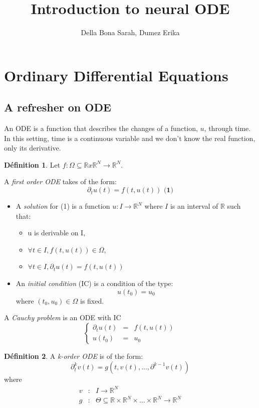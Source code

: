 \documentclass[10pt,a4paper]{article}
\author{Della Bona Sarah, Dumez Erika}
\title{Introduction to neural ODE}
\theoremstyle{definition}
\newtheorem{definition}{Définition}
\theoremstyle{theorem}
\begin{document}
\maketitle
 
 
\section{Ordinary Differential Equations}

\subsection{A refresher on ODE}

An ODE is a function that describes the changes of a function, $u$, through time. In this setting, time is a continuous variable and we don't know the real function, only its derivative.

\begin{definition}
Let $f: \Omega \subseteq \mathbb{R} x \mathbb{R}^N \rightarrow \mathbb{R}^N$. 

A \textit{first order ODE} takes of the form:
\[
\partial_t u(t) = f(t,u(t)) \textbf{   (1)}
\]

\begin{itemize}
\item A \textit{solution} for (1) is a function $u : I \rightarrow \mathbb{R}^N$ where $I$ is an interval of $\mathbb{R}$ such that:
	\begin{itemize}
	\item u is derivable on I,
	\item $\forall t \in I, f(t, u(t)) \in \Omega$,
	\item $\forall t \in I, \partial_t u(t) = f(t, u(t))$
	\end{itemize}
\item An \textit{initial condition} (IC) is a condition of the type:
\[
u(t_0) = u_0
\]
where $(t_0, u_0) \in \Omega$ is fixed.
\end{itemize}
\item A \textit{Cauchy problem} is an ODE with IC
\[
\left \{
\begin{array}{rcl}
\partial_t u(t) & = & f(t, u(t)) \\
u(t_0) & = & u_0
\end{array}
\right.
\]
\end{definition}

\begin{definition}
A \textit{k-order ODE} is of the form:
\[
\partial^k_t v(t) = g(t, v(t), ... , \partial^{k-1}v(t))
\]
where 
   \begin{eqnarray}
   \nonumber
   v & : & I \rightarrow \mathbb{R}^N \\ 
   \nonumber
   g & : & \Theta \subseteq \mathbb{R} \times \mathbb{R}^N \times ... \times \mathbb{R}^N \rightarrow \mathbb{R}^N
   \end{eqnarray}
\end{definition}
\end{document}

